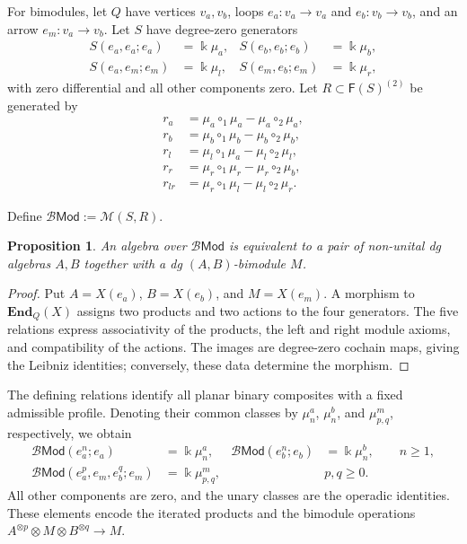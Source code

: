 \documentclass[11pt,letterpaper]{article}
\numberwithin{equation}{section}
\theoremstyle{plain}
\newtheorem{prop}[thm]{Proposition}
\theoremstyle{definition}
\theoremstyle{remark}
\begin{document}
For bimodules, let $Q$ have vertices $v_a,v_b$, loops
$e_a:v_a\to v_a$ and $e_b:v_b\to v_b$, and an arrow $e_m:v_a\to v_b$.
Let $S$ have degree-zero generators
\[
\begin{aligned}
S(e_a,e_a;e_a)&=\Bbbk\mu_a,& S(e_b,e_b;e_b)&=\Bbbk\mu_b,\\
S(e_a,e_m;e_m)&=\Bbbk\mu_l,& S(e_m,e_b;e_m)&=\Bbbk\mu_r,
\end{aligned}
\]
with zero differential and all other components zero. Let
$R\subset\mathsf F(S)^{(2)}$ be generated by
\begin{equation}
\label{eq_R_BiMod}
\begin{aligned}
r_a	&= \mu_a\circ_1\mu_a - \mu_a\circ_2\mu_a,\\
r_b	&= \mu_b\circ_1\mu_b-\mu_b\circ_2\mu_b,\\
r_l	&= \mu_l\circ_1\mu_a-\mu_l\circ_2\mu_l,\\
r_r	&= \mu_r\circ_1\mu_r-\mu_r\circ_2\mu_b,\\
r_{lr}	&= \mu_r\circ_1\mu_l- \mu_l\circ_2\mu_r.
\end{aligned}
\end{equation}

Define $\mathscr B\mathsf{Mod}:=\mathscr M(S,R)$.

\begin{prop}
\label{prop_bimod}
An algebra over $\mathscr B\mathsf{Mod}$ is equivalent to a pair of
non-unital dg algebras $A,B$ together with a dg $(A,B)$-bimodule $M$.
\end{prop}
\begin{proof}
Put $A=X(e_a)$, $B=X(e_b)$, and $M=X(e_m)$.
A morphism to $\mathbf{End}_Q(X)$ assigns two products and two actions
to the four generators. The five relations express associativity of
the products, the left and right module axioms, and compatibility of
the actions. The images are degree-zero cochain maps, giving the
Leibniz identities; conversely, these data determine the morphism.
\end{proof}

The defining relations identify all planar binary composites with a
fixed admissible profile. Denoting their common classes by
$\mu_n^a$, $\mu_n^b$, and $\mu_{p,q}^m$, respectively, we obtain
\[
\begin{aligned}
\mathscr B\mathsf{Mod}(e_a^n;e_a)&=\Bbbk\mu_n^a,&
\mathscr B\mathsf{Mod}(e_b^n;e_b)&=\Bbbk\mu_n^b,
\qquad n\ge1,\\
\mathscr B\mathsf{Mod}(e_a^p,e_m,e_b^q;e_m)&=\Bbbk\mu_{p,q}^m,
&&p,q\ge0.
\end{aligned}
\]
All other components are zero, and the unary classes are the operadic
identities. These elements encode the iterated products and the
bimodule operations $A^{\otimes p}\otimes M\otimes B^{\otimes q}\to M$.
\end{document}
